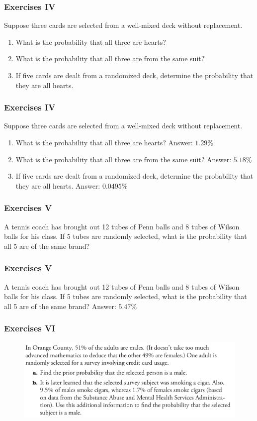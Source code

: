 \documentclass[xcolor=dvipsnames]{beamer}
\begin{document}
\begin{frame}
  \frametitle{Exercises IV}
Suppose three cards are selected from a well-mixed deck without
replacement. 
\begin{enumerate}
\item<1-> What is the probability that all three are hearts?
\item<2-> What is the probability that all three are from the same
  suit?
\item<3-> If five cards are dealt from a randomized deck, determine
  the probability that they are all hearts.
\end{enumerate}
\end{frame}

\begin{frame}
  \frametitle{Exercises IV}
Suppose three cards are selected from a well-mixed deck without
replacement. 
\begin{enumerate}
\item What is the probability that all three are hearts? Answer: $1.29$\%
\item What is the probability that all three are from the same
  suit? Answer: $5.18$\%
\item If five cards are dealt from a randomized deck, determine
  the probability that they are all hearts. Answer: $0.0495$\%
\end{enumerate}
\end{frame}

\begin{frame}
  \frametitle{Exercises V}
  A tennis coach has brought out 12 tubes of Penn balls and 8 tubes of
  Wilson balls for his class. If 5 tubes are randomly selected, what
  is the probability that all 5 are of the same brand?
\end{frame}

\begin{frame}
  \frametitle{Exercises V}
  A tennis coach has brought out 12 tubes of Penn balls and 8 tubes of
  Wilson balls for his class. If 5 tubes are randomly selected, what
  is the probability that all 5 are of the same brand? Answer: $5.47$\%
\end{frame}

\begin{frame}
  \frametitle{Exercises VI}
\begin{figure}[h]
\includegraphics[scale=.32]{./diagrams/triola_bayes1.png}
\end{figure}
\end{frame}
\end{document}
